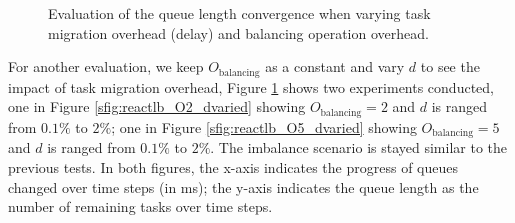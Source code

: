 \begin{figure}[t]
\centering
{} \\

 \\


\caption{Evaluation of the queue length convergence when varying task migration overhead (delay) and balancing operation overhead.}
\label{fig:evaluation_Obalancing_effects}
\end{figure}

For another evaluation, we keep $O_{\text{balancing}}$ as a constant and vary $d$ to see the impact of task migration overhead, Figure \ref{fig:evaluation_Obalancing_effects} shows two experiments conducted, one in Figure \ref{sfig:reactlb_O2_dvaried} showing $O_{\text{balancing}}=2$ and $d$ is ranged from $0.1\%$ to $2\%$; one in Figure \ref{sfig:reactlb_O5_dvaried} showing $O_{\text{balancing}}=5$ and $d$ is ranged from $0.1\%$ to $2\%$. The imbalance scenario is stayed similar to the previous tests. In both figures, the x-axis indicates the progress of queues changed over time steps (in ms); the y-axis indicates the queue length as the number of remaining tasks over time steps.\\

